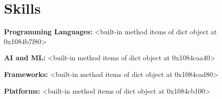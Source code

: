 \section{Skills}

    \begin{onecolentry}
        \textbf{Programming Languages:} <built-in method items of dict object at 0x1084b7f80>
    \end{onecolentry}

    \vspace{0.05 cm}

    \begin{onecolentry}
        \textbf{AI and ML:} <built-in method items of dict object at 0x1084caa40>
    \end{onecolentry}

    \vspace{0.05 cm}

    \begin{onecolentry}
        \textbf{Frameworks:} <built-in method items of dict object at 0x1084cad80>
    \end{onecolentry}

    \vspace{0.05 cm}

    \begin{onecolentry}
        \textbf{Platforms:} <built-in method items of dict object at 0x1084cb100>
    \end{onecolentry}

    \vspace{0.05 cm}

